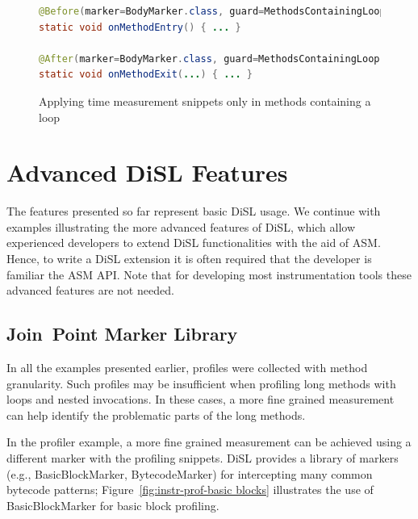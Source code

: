 \documentclass{article}
\newcommand{\brcode}[1]{\textsf{#1}}
\newcommand{\code}[1]{\mbox{\brcode{#1}}}
\begin{document}
\begin{figure}[h!]
\smaller
\begin{lstlisting}[language=Java]
@Before(marker=BodyMarker.class, guard=MethodsContainingLoop.class)
static void onMethodEntry() { ... }

@After(marker=BodyMarker.class, guard=MethodsContainingLoop.class)
static void onMethodExit(...) { ... }
\end{lstlisting}
\caption{Applying time measurement snippets only in methods containing a loop}
\label{fig:instr-prof-loopguard}
\end{figure}


\section{Advanced DiSL Features}\label{sec:Advanced}


The features presented so far represent basic DiSL usage.
We continue with examples illustrating the more advanced features of DiSL, which allow experienced developers to extend DiSL functionalities with the aid of ASM.
Hence, to write a DiSL extension it is often required that the developer is familiar the ASM API.
Note that for developing most instrumentation tools these advanced features are not needed.
%


\subsection{Join~Point Marker Library}

In all the examples presented earlier, profiles were collected with method granularity.
Such profiles may be insufficient when profiling long methods with loops and nested invocations.
In these cases, a more fine grained measurement can help identify the problematic parts of the long methods.

In the profiler example, a more fine grained measurement can be achieved using a different marker with the profiling snippets.
DiSL provides a library of markers (e.g., \code{BasicBlockMarker}, \code{BytecodeMarker}) for intercepting many common bytecode patterns; Figure~\ref{fig:instr-prof-basic blocks} illustrates the use of \code{BasicBlockMarker} for basic block profiling.
\end{document}
